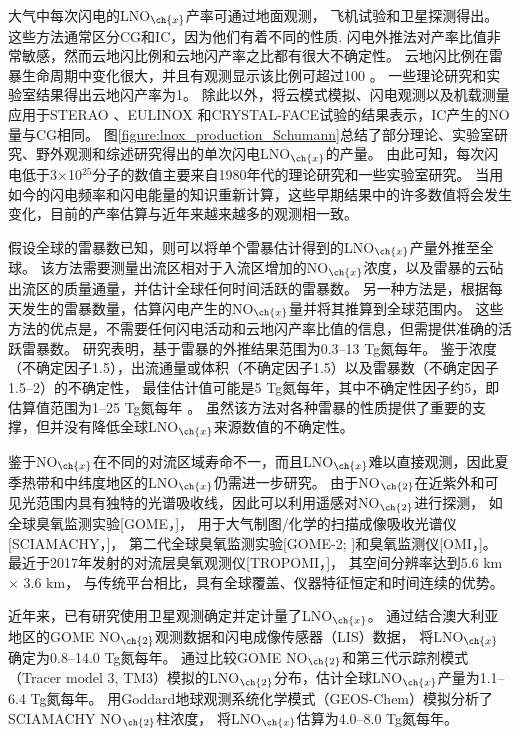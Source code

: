 大气中每次闪电的LNO$_{\ch{x}}$产率可通过地面观测\citep{Noxon.1976}，
飞机试验\citep{Chameides.1987}和卫星探测\citep{Beirle.2004}得出。
这些方法通常区分CG和IC，因为他们有着不同的性质.
闪电外推法对产率比值非常敏感\citep{Bond.2002}，然而云地闪比例和云地闪产率之比都有很大不确定性。
云地闪比例在雷暴生命周期中变化很大，并且有观测显示该比例可超过100 \citep{Dye.2000,DeCaria.2005,Ott.2007}。
一些理论研究\citep{Cooray.1997}和实验室结果\citep{Cooray.2005}得出云地闪产率为1。
除此以外，将云模式模拟、闪电观测以及机载测量应用于STERAO \citep{DeCaria.2000}、EULINOX \citep{Fehr.2004}和CRYSTAL-FACE试验的结果表示，IC产生的NO量与CG相同。
图\ref{figure:lnox_production_Schumann}总结了部分理论、实验室研究、野外观测和综述研究得出的单次闪电LNO$_{\ch{x}}$的产量。
由此可知，每次闪电低于3$\times$10$^{25}$分子的数值主要来自1980年代的理论研究和一些实验室研究。
当用如今的闪电频率和闪电能量的知识重新计算，这些早期结果中的许多数值将会发生变化，目前的产率估算与近年来越来越多的观测相一致。


假设全球的雷暴数已知，则可以将单个雷暴估计得到的LNO$_{\ch{x}}$产量外推至全球\citep{Chameides.1987,Huntrieser.1998,Huntrieser.2002}。
该方法需要测量出流区相对于入流区增加的NO$_{\ch{x}}$浓度，以及雷暴的云砧出流区的质量通量，并估计全球任何时间活跃的雷暴数。
另一种方法是，根据每天发生的雷暴数量，估算闪电产生的NO$_{\ch{x}}$量并将其推算到全球范围内\citep{Ridley.2004}。 这些方法的优点是，不需要任何闪电活动和云地闪产率比值的信息，但需提供准确的活跃雷暴数。
研究表明，基于雷暴的外推结果范围为0.3--13 Tg氮每年。
鉴于浓度（不确定因子1.5），出流通量或体积（不确定因子1.5）以及雷暴数（不确定因子1.5--2）的不确定性，
最佳估计值可能是5 Tg氮每年，其中不确定性因子约5，即估算值范围为1--25 Tg氮每年 \citep{Chameides.1987}。
虽然该方法对各种雷暴的性质提供了重要的支撑，但并没有降低全球LNO$_{\ch{x}}$来源数值的不确定性。


鉴于NO$_{\ch{x}}$在不同的对流区域寿命不一，而且LNO$_{\ch{x}}$难以直接观测，因此夏季热带和中纬度地区的LNO$_{\ch{x}}$仍需进一步研究。
由于NO$_{\ch{2}}$在近紫外和可见光范围内具有独特的光谱吸收线，因此可以利用遥感对NO$_{\ch{2}}$进行探测\citep{Platt.1983}，
如全球臭氧监测实验[GOME，\citet{Burrows.1999}]，
用于大气制图/化学的扫描成像吸收光谱仪[SCIAMACHY，\citet{Bovensmann.1999}]，
第二代全球臭氧监测实验[GOME-2; \citet{Callies.2000}]和臭氧监测仪[OMI，\citet{Levelt.2006}]。
最近于2017年发射的对流层臭氧观测仪[TROPOMI，\citet{Veefkind.2012}]，
其空间分辨率达到5.6 km $\times$ 3.6 km，
与传统平台相比，具有全球覆盖、仪器特征恒定和时间连续的优势。

近年来，已有研究使用卫星观测确定并定计量了LNO$_{\ch{x}}$。
\citet{Beirle.2004}通过结合澳大利亚地区的GOME NO$_{\ch{2}}$观测数据和闪电成像传感器（LIS）数据，
将LNO$_{\ch{x}}$确定为0.8--14.0 Tg氮每年。
\citet{Boersma.2005}通过比较GOME NO$_{\ch{2}}$和第三代示踪剂模式（Tracer model 3, TM3）模拟的LNO$_{\ch{2}}$分布，估计全球LNO$_{\ch{x}}$产量为1.1--6.4 Tg氮每年。
\citet{Martin.2007a}用Goddard地球观测系统化学模式（GEOS-Chem）模拟分析了SCIAMACHY NO$_{\ch{2}}$柱浓度，
将LNO$_{\ch{x}}$估算为4.0--8.0 Tg氮每年。

